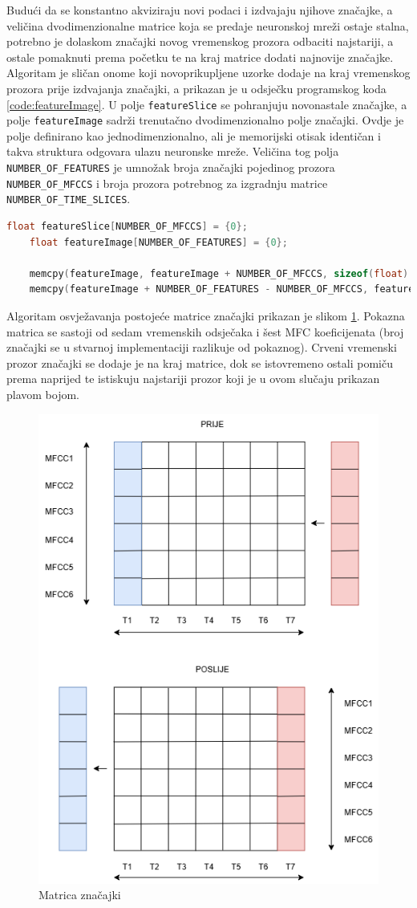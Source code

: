Budući da se konstantno akviziraju novi podaci i izdvajaju njihove značajke, a veličina
dvodimenzionalne matrice koja se predaje neuronskoj mreži ostaje stalna, potrebno je 
dolaskom značajki novog vremenskog prozora odbaciti najstariji, a ostale pomaknuti prema početku
te na kraj matrice dodati najnovije značajke. Algoritam je sličan onome koji novoprikupljene
uzorke dodaje na kraj vremenskog prozora prije izdvajanja značajki, a prikazan je u odsječku
programskog koda \ref{code:featureImage}. U polje \texttt{featureSlice} se pohranjuju novonastale
značajke, a polje \texttt{featureImage} sadrži trenutačno dvodimenzionalno polje značajki. Ovdje je
polje definirano kao jednodimenzionalno, ali je memorijski otisak identičan i
takva struktura odgovara ulazu neuronske mreže. Veličina tog polja \texttt{NUMBER\_OF\_FEATURES} je 
umnožak broja značajki pojedinog prozora \texttt{NUMBER\_OF\_MFCCS} i broja prozora potrebnog za 
izgradnju matrice \texttt{NUMBER\_OF\_TIME\_SLICES}.

\begin{lstlisting}[language=C++, caption=Generiranje matrice značajki, label=code:featureImage]
    float featureSlice[NUMBER_OF_MFCCS] = {0};
    float featureImage[NUMBER_OF_FEATURES] = {0};

    memcpy(featureImage, featureImage + NUMBER_OF_MFCCS, sizeof(float) * (NUMBER_OF_FEATURES - NUMBER_OF_MFCCS));
    memcpy(featureImage + NUMBER_OF_FEATURES - NUMBER_OF_MFCCS, featureSlice, sizeof(float) * NUMBER_OF_MFCCS);
\end{lstlisting}

Algoritam osvježavanja postojeće matrice značajki prikazan je slikom \ref{pic:featureImage}. 
Pokazna matrica se sastoji od sedam vremenskih odsječaka i šest MFC koeficijenata
(broj značajki se u stvarnoj implementaciji razlikuje od pokaznog). Crveni 
vremenski prozor značajki se dodaje je na kraj matrice, dok se istovremeno ostali pomiču prema
naprijed te istiskuju najstariji prozor koji je u ovom slučaju prikazan plavom bojom.

\begin{figure}[htb]
    \centering
    \includegraphics[width=0.4\linewidth]{Chapters/struktura_sustava/generiranje_znacajki/featureImage.png} 
    \caption{Matrica značajki \cite{flowchart}}
    \label{pic:featureImage}
\end{figure}